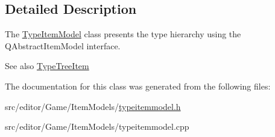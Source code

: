 \subsection{\-Detailed \-Description}
\-The \hyperlink{class_type_item_model}{\-Type\-Item\-Model} class presents the type hierarchy using the \-Q\-Abstract\-Item\-Model interface. 

\begin{DoxySeeAlso}{\-See also}
\hyperlink{class_type_tree_item}{\-Type\-Tree\-Item} 
\end{DoxySeeAlso}


\-The documentation for this class was generated from the following files\-:\begin{DoxyCompactItemize}
\item 
src/editor/\-Game/\-Item\-Models/\hyperlink{typeitemmodel_8h}{typeitemmodel.\-h}\item 
src/editor/\-Game/\-Item\-Models/typeitemmodel.\-cpp\end{DoxyCompactItemize}
